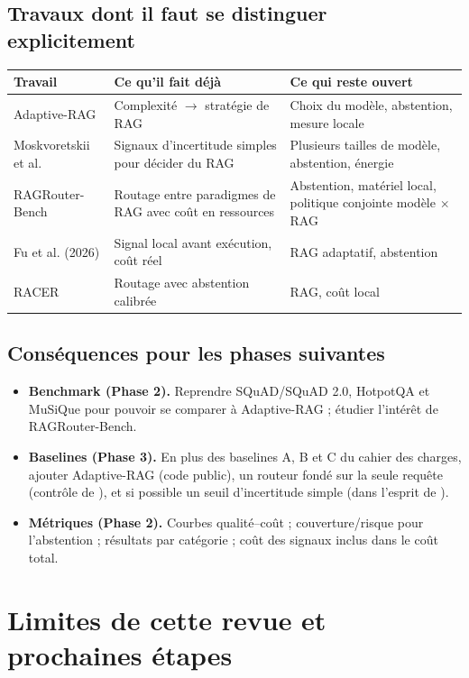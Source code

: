\documentclass[11pt,a4paper]{article}
\begin{document}
\subsection{Travaux dont il faut se distinguer explicitement}
\begin{center}\small
\begin{tabularx}{\textwidth}{l Y Y}
\toprule
\textbf{Travail} & \textbf{Ce qu'il fait déjà} & \textbf{Ce qui reste ouvert} \\
\midrule
Adaptive-RAG & Complexité $\rightarrow$ stratégie de RAG & Choix du modèle, abstention, mesure locale \\
Moskvoretskii et al. & Signaux d'incertitude simples pour décider du RAG & Plusieurs tailles de modèle, abstention, énergie \\
RAGRouter-Bench & Routage entre paradigmes de RAG avec coût en ressources & Abstention, matériel local, politique conjointe modèle $\times$ RAG \\
Fu et al. (2026) & Signal local avant exécution, coût réel & RAG adaptatif, abstention \\
RACER & Routage avec abstention calibrée & RAG, coût local \\
\bottomrule
\end{tabularx}
\end{center}

\subsection{Conséquences pour les phases suivantes}
\begin{itemize}
\item \textbf{Benchmark (Phase 2).} Reprendre SQuAD/SQuAD 2.0, HotpotQA et MuSiQue pour pouvoir se
comparer à Adaptive-RAG ; étudier l'intérêt de RAGRouter-Bench.
\item \textbf{Baselines (Phase 3).} En plus des baselines A, B et C du cahier des charges, ajouter
Adaptive-RAG (code public), un routeur fondé sur la seule requête (contrôle de \citealp{li2026beyond}),
et si possible un seuil d'incertitude simple (dans l'esprit de \citealp{moskvoretskii2025adaptive}).
\item \textbf{Métriques (Phase 2).} Courbes qualité--coût ; couverture/risque pour l'abstention ;
résultats par catégorie ; coût des signaux inclus dans le coût total.
\end{itemize}

\section{Limites de cette revue et prochaines étapes}\label{sec:limites}
\end{document}
